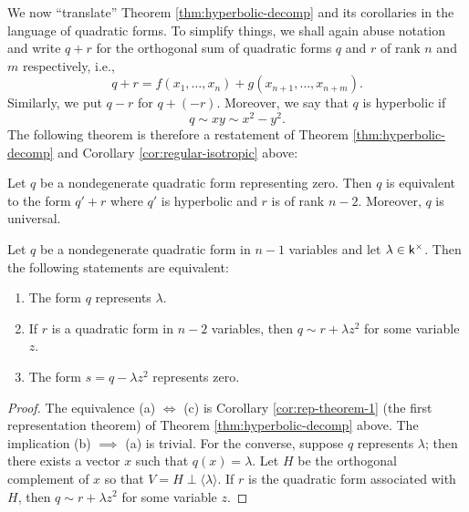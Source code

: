 We now ``translate'' Theorem \ref{thm:hyperbolic-decomp} and its corollaries in the language of quadratic forms. To simplify things, we shall again abuse notation and write \(q + r\) for the orthogonal sum of quadratic forms \(q\) and \(r\) of rank \(n\) and \(m\) respectively, i.e.,
\[q + r = f(x_1, \dots, x_n) + g(x_{n+1}, \dots, x_{n+m}).\]
Similarly, we put \(q - r\) for \(q + (-r)\). Moreover, we say that \(q\) is hyperbolic if
\[
    q \sim xy \sim x^2 - y^2.
\]
The following theorem is therefore a restatement of Theorem \ref{thm:hyperbolic-decomp} and Corollary \ref{cor:regular-isotropic} above:

\begin{theoremx}\label{thm:hyperbolic-decomp-2}
    Let \(q\) be a nondegenerate quadratic form representing zero. Then \(q\) is equivalent to the form \(q' + r\) where \(q'\) is hyperbolic and \(r\) is of rank \(n - 2\). Moreover, \(q\) is universal.
\end{theoremx}

\begin{corollary}
    Let \(q\) be a nondegenerate quadratic form in \(n - 1\) variables and let \(\lambda \in \mathsf{k}^{\times}\). Then the following statements are equivalent:

    \smallskip

    \begin{enumerate}[nosep, label=(\alph*)]
        \item The form \(q\) represents \(\lambda\).
        \item If \(r\) is a quadratic form in \(n - 2\) variables, then \(q \sim r + \lambda z^2\) for some variable \(z\).
        \item The form \(s = q - \lambda z^2\) represents zero.
    \end{enumerate}
\end{corollary}

\begin{proof}
    The equivalence (a) \(\iff\) (c) is Corollary \ref{cor:rep-theorem-1} (the first representation theorem) of Theorem \ref{thm:hyperbolic-decomp} above. The implication (b) \(\implies\) (a) is trivial. For the converse, suppose \(q\) represents \(\lambda\); then there exists a vector \(x\) such that \(q(x) = \lambda\). Let \(H\) be the orthogonal complement of \(x\) so that \(V = H \perp \langle \lambda \rangle.\) If \(r\) is the quadratic form associated with \(H\), then \(q \sim r + \lambda z^2\) for some variable \(z\).
\end{proof}

